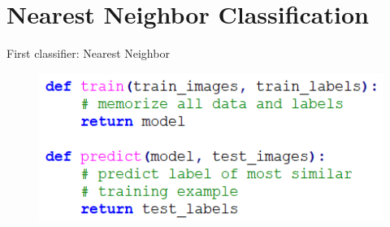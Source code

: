 \documentclass[dvipsnames]{beamer}
\begin{document}
\section{Nearest Neighbor Classification}
\begin{frame}{First classifier: Nearest Neighbor}
\begin{figure}
\includegraphics[scale=.7]{figures/knn_func.png}
\end{figure}
\end{frame}
\end{document}
